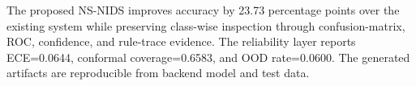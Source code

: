 The proposed NS-NIDS improves accuracy by 23.73 percentage points over the existing system while preserving class-wise inspection through confusion-matrix, ROC, confidence, and rule-trace evidence. The reliability layer reports ECE=0.0644, conformal coverage=0.6583, and OOD rate=0.0600. The generated artifacts are reproducible from backend model and test data.